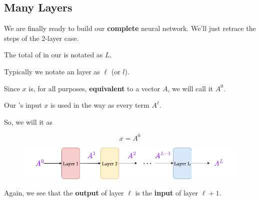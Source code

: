     \subsection*{Many Layers}
    
        We are finally ready to build our \textbf{complete} neural network. We'll just retrace the steps of the 2-layer case.\\
        
        \begin{notation}
            The total  of  in our  is notated as $L$.
            
            Typically we notate an  layer as $\ell$ (or $l$).
        \end{notation}
        
        Since $x$ is, for all purposes, \textbf{equivalent} to a vector $A$, we will call it $A^0$.\\
        
        \begin{notation}
            Our 's input $x$ is used in the  way as every term $A^\ell$.
            
            So, we will  it as 
            
            \begin{equation*}
                x = A^0
            \end{equation*}
        \end{notation}
        
        \begin{figure}[H]
            \centering
            \includegraphics[width=140mm,scale=0.4]{images/nn_images/all_layers.png}
        \end{figure}
        
        Again, we see that the \textbf{output} of layer $\ell$ is the \textbf{input} of layer $\ell+1$.\\
        
